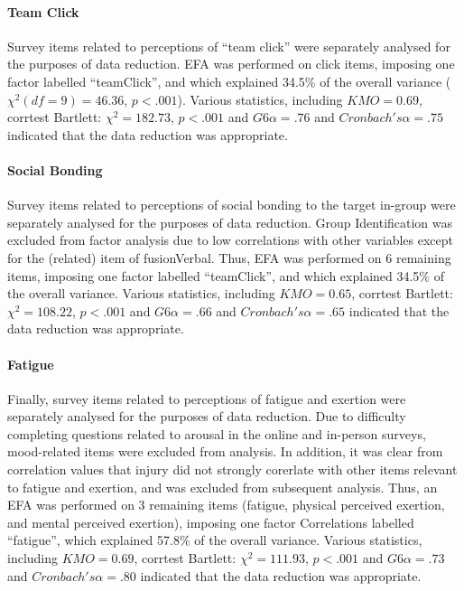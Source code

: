 \documentclass[12pt]{report}
\begin{document}
\paragraph{Team Click}
Survey items related to perceptions of ``team click'' were separately analysed for the purposes of data reduction.  EFA was performed on click items, imposing one factor labelled ``teamClick'', and which explained 34.5\% of the overall variance ($\chi^2 (df=9) = 46.36$, $p < .001$).  Various statistics, including $KMO =  0.69$, corrtest Bartlett: $\chi^2 =  182.73$, $p < .001$ and $G6\alpha =.76$ and $Cronbach's \alpha = .75$ indicated that the data reduction was appropriate.



\paragraph{Social Bonding}

Survey items related to perceptions of social bonding to the target in-group were separately analysed for the purposes of data reduction.  Group Identification was excluded from factor analysis due to low correlations with other variables except for the (related) item of fusionVerbal. Thus,  EFA was performed on 6 remaining items, imposing one factor labelled ``teamClick'', and which explained 34.5\% of the overall variance.  Various statistics, including $KMO =  0.65$, corrtest Bartlett: $\chi^2 =   108.22$, $p < .001$ and $G6\alpha =.66$ and $Cronbach's \alpha = .65$ indicated that the data reduction was appropriate.


\paragraph{Fatigue}
Finally, survey items related to perceptions of fatigue and exertion were separately analysed for the purposes of data reduction.  Due to difficulty completing questions related to arousal in the online and in-person surveys, mood-related items were excluded from analysis.  In addition, it was clear from correlation values that injury did not strongly corerlate with other items relevant to fatigue and exertion, and was excluded from subsequent analysis. Thus, an EFA was performed on 3 remaining items (fatigue, physical perceived exertion, and mental perceived exertion), imposing one factor   Correlations labelled ``fatigue'', which explained 57.8\% of the overall variance.  Various statistics, including $KMO =  0.69$, corrtest Bartlett: $\chi^2 =    111.93$, $p < .001$ and $G6\alpha =.73$ and $Cronbach's \alpha = .80$ indicated that the data reduction was appropriate.
\end{document}
